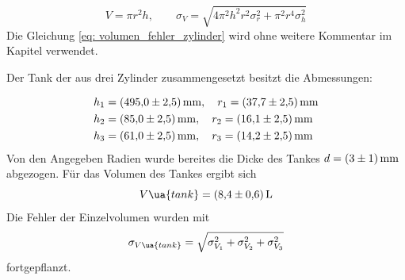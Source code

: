 \begin{equation}
  \label{eq: volumen_fehler_zylinder}
  V=\pi r^2 h, \qquad \sigma_{V}=\sqrt{4 \pi^{2} h^{2} r^{2} \sigma_{r}^{2}  + \pi^{2} r^{4} \sigma_{h}^{2} }
\end{equation}
Die Gleichung \ref{eq: volumen_fehler_zylinder} wird ohne weitere Kommentar im Kapitel verwendet.

Der Tank der aus drei Zylinder zusammengesetzt besitzt die Abmessungen:

\begin{align*}
h_1&=\SI{495 \pm 2.5}{\milli\meter}, \quad r_1=\SI{37.7\pm2.5}{\milli\meter} \\
h_2&=\SI{85 \pm 2.5}{\milli\meter}, \quad r_2=\SI{16.1\pm 2.5}{\milli\meter} \\
h_3&=\SI{61 \pm 2.5}{\milli\meter}, \quad r_3=\SI{14.2\pm 2.5}{\milli\meter} \\
\end{align*}
Von den Angegeben Radien wurde bereites die Dicke des Tankes $d=\SI{3\pm1}{\milli\meter}$ abgezogen.
Für das Volumen des Tankes ergibt sich
\begin{equation}
  \label{eq:volumen Tank}
  V\ua{tank}=\SI{8.4\pm0.6}{\litre}
\end{equation}
Die Fehler der Einzelvolumen wurden mit
\begin{equation}
  \label{eq:fehler_addi}
  \sigma_{V\ua{tank}}=\sqrt{\sigma_{V_{1}}^{2} + \sigma_{V_{2}}^{2}+\sigma_{V_{3}}^{2}}
\end{equation}
fortgepflanzt.

